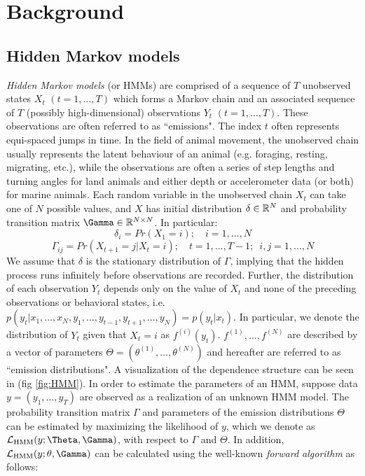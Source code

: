 
\section{Background}

\subsection{Hidden Markov models}
\label{subsection:HMMs}

\textit{Hidden Markov models} (or HMMs) are comprised of a sequence of $T$ unobserved states $X_t$ $(t = 1, \ldots, T)$ which forms a Markov chain and an associated sequence of $T$ (possibly high-dimensional) observations $Y_t$ $(t = 1, \ldots, T)$. These observations are often referred to as ``emissions". The index $t$ often represents equi-spaced jumps in time. In the field of animal movement, the unobserved chain usually represents the latent behaviour of an animal (e.g. foraging, resting, migrating, etc.), while the observations are often a series of step lengths and turning angles for land animals and either depth or accelerometer data (or both) for marine animals. Each random variable in the unobserved chain $X_t$ can take one of $N$ possible values, and $X$ has initial distribution $\delta \in \mathbb{R}^N$ and probability transition matrix $\Gamma \in \bbR^{N \times N}$. In particular:
%
$$\delta_i = Pr(X_1 = i); \quad i = 1,\ldots,N$$
%
$$\Gamma_{ij} = Pr(X_{t+1} = j | X_t = i); \quad t = 1, \ldots, T-1; \enspace i,j = 1,\ldots,N $$
%
We assume that $\delta$ is the stationary distribution of $\Gamma$, implying that the hidden process runs infinitely before observations are recorded. Further, the distribution of each observation $Y_t$ depends only on the value of $X_t$ and none of the preceding observations or behavioral states, i.e. $p(y_t|x_1,\ldots, x_N, y_1,\ldots,y_{t-1},y_{t+1},\ldots,y_N) = p(y_t|x_t)$. In particular, we denote the distribution of $Y_t$ given that $X_t = i$ as $f^{(i)}(y_t)$. $f^{(1)},\ldots,f^{(N)}$ are described by a vector of parameters $\Theta = (\theta^{(1)},\ldots,\theta^{(N)})$ and hereafter are referred to as ``emission distributions". A visualization of the dependence structure can be seen in (fig \ref{fig:HMM}).
In order to estimate the parameters of an HMM, suppose data $y = (y_1,\ldots,y_T)$ are observed as a realization of an unknown HMM model. The probability transition matrix $\Gamma$ and parameters of the emission distributions $\Theta$ can be estimated by maximizing the likelihood of $y$, which we denote as $\calL_{\text{HMM}}(y;\Theta,\Gamma)$, with respect to $\Gamma$ and $\Theta$. In addition, $\calL_{\text{HMM}}(y;\theta,\Gamma)$ can be calculated using the well-known \textit{forward algorithm} \cite{Zucchini:2016} as follows:
